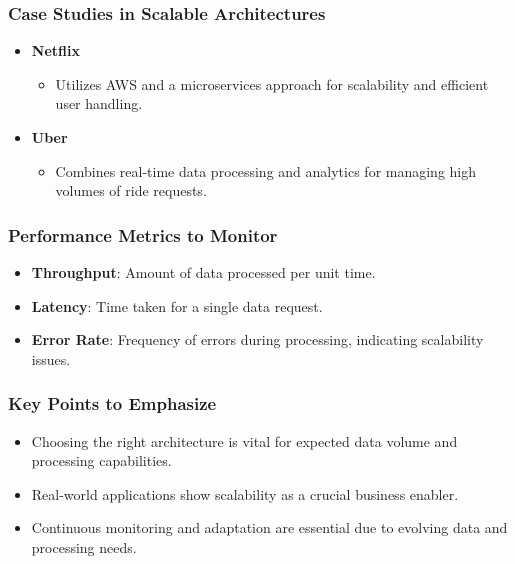 \documentclass[aspectratio=169]{beamer}
\begin{document}
\begin{frame}[fragile]
    \frametitle{Case Studies in Scalable Architectures}
    \begin{itemize}
        \item \textbf{Netflix} 
        \begin{itemize}
            \item Utilizes AWS and a microservices approach for scalability and efficient user handling.
        \end{itemize}
        
        \item \textbf{Uber}
        \begin{itemize}
            \item Combines real-time data processing and analytics for managing high volumes of ride requests.
        \end{itemize}
    \end{itemize}
\end{frame}

\begin{frame}[fragile]
    \frametitle{Performance Metrics to Monitor}
    \begin{itemize}
        \item \textbf{Throughput}: Amount of data processed per unit time.
        \item \textbf{Latency}: Time taken for a single data request.
        \item \textbf{Error Rate}: Frequency of errors during processing, indicating scalability issues.
    \end{itemize}
\end{frame}

\begin{frame}[fragile]
    \frametitle{Key Points to Emphasize}
    \begin{itemize}
        \item Choosing the right architecture is vital for expected data volume and processing capabilities.
        \item Real-world applications show scalability as a crucial business enabler.
        \item Continuous monitoring and adaptation are essential due to evolving data and processing needs.
    \end{itemize}
\end{frame}
\end{document}
